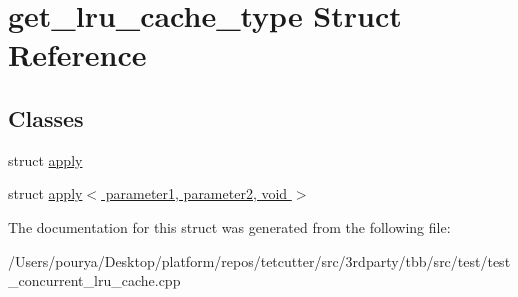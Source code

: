 \hypertarget{structget__lru__cache__type}{}\section{get\+\_\+lru\+\_\+cache\+\_\+type Struct Reference}
\label{structget__lru__cache__type}
\subsection*{Classes}
\begin{DoxyCompactItemize}
\item 
struct \hyperlink{structget__lru__cache__type_1_1apply}{apply}
\item 
struct \hyperlink{structget__lru__cache__type_1_1apply_3_01parameter1_00_01parameter2_00_01void_01_4}{apply$<$ parameter1, parameter2, void $>$}
\end{DoxyCompactItemize}


The documentation for this struct was generated from the following file\+:\begin{DoxyCompactItemize}
\item 
/\+Users/pourya/\+Desktop/platform/repos/tetcutter/src/3rdparty/tbb/src/test/test\+\_\+concurrent\+\_\+lru\+\_\+cache.\+cpp\end{DoxyCompactItemize}
